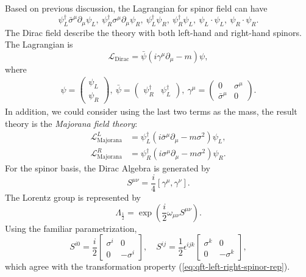 Based on previous discussion, the Lagrangian for spinor field can have
\begin{equation}
	\psi_L^\dagger \bar\sigma^\mu \partial_\mu \psi_L,\ 
	\psi_R^\dagger \sigma^\mu \partial_\mu \psi_R,\ 
	\psi_L^\dagger \psi_R,\ \psi_R^\dagger \psi_L,\ 
	\psi_L \cdot \psi_L,\ \psi_R \cdot \psi_R.
\end{equation}
The Dirac field describe the theory with both left-hand and right-hand spinors.
The Lagrangian is
\begin{equation}
	\mathcal{L}_{\mathrm{Dirac}}
	= \bar\psi \left(i\gamma^\mu \partial_\mu - m\right)\psi,
\end{equation}
where
\begin{eqnarray}
	\psi = \left(\begin{array}{c}
		\psi_L \\ \psi_R
	\end{array}\right),\ 
	\bar\psi = \left(\begin{array}{cc}
		\psi_R^\dagger & \psi_L^\dagger
	\end{array}\right),\ 
	\gamma^\mu = \left(\begin{array}{cc}
		0 & \sigma^\mu \\
		\bar\sigma^\mu & 0
	\end{array}\right).
\end{eqnarray}
In addition, we could consider using the last two terms as the mass, the result theory is the \textit{Majorana field theory}:
\begin{equation}
\begin{aligned}
	\mathcal{L}^{L}_{\mathrm{Majorana}}
	&= \psi_L^\dagger \left(i\bar\sigma^\mu \partial_\mu -m \sigma^2 \right) \psi_L, \\
	\mathcal{L}^{R}_{\mathrm{Majorana}}
	&= \psi_R^\dagger \left(i\sigma^\mu \partial_\mu -m \sigma^2 \right) \psi_R. 
\end{aligned}
\end{equation} 
For the spinor basis, the Dirac Algebra is generated by
\begin{equation}\label{eq:qft-diract-generator}
	S^{\mu\nu} = \frac{i}{4}[\gamma^\mu, \gamma^\nu].
\end{equation}
The Lorentz group is represented by
\begin{equation}\label{eq:qft-dirac-rep}
	\Lambda_{\frac{1}{2}} = \exp\left(\frac{i}{2}\omega_{\mu\nu} S^{\mu\nu}\right).
\end{equation}
Using the familiar parametrization,
\begin{equation}
	S^{i0} = \frac{i}{2}\left[\begin{array}{cc}
		\sigma^i & 0 \\ 0 & -\sigma^i
	\end{array}\right], \quad 
	S^{ij} = \frac{1}{2}\epsilon^{ijk} \left[\begin{array}{cc}
		\sigma^k & 0 \\ 0 & -\sigma^k
	\end{array}\right],
\end{equation}
which agree with the transformation property (\ref{eq:qft-left-right-spinor-rep}).


